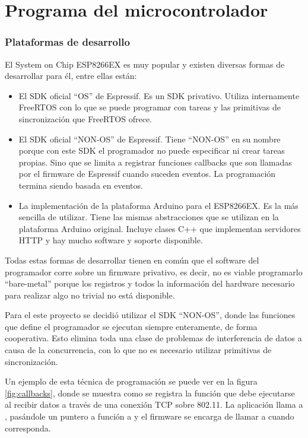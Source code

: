 \section{Programa del microcontrolador} \label{sec:sw-implementacion}

\subsubsection{Plataformas de desarrollo}\label{sec:sdk}
El System on Chip ESP8266EX es muy popular y existen diversas formas de desarrollar para él, entre ellas están:
\begin{itemize}
	\item El SDK oficial \enquote{OS} de Espressif. Es un SDK privativo. Utiliza internamente FreeRTOS con lo que se puede programar con tareas y las primitivas de sincronización que FreeRTOS ofrece.
	\item El SDK oficial \enquote{NON-OS} de Espressif. Tiene \enquote{NON-OS} en su nombre porque con este SDK el programador no puede especificar ni crear tareas propias. Sino que se limita a registrar funciones callbacks que son llamadas por el firmware de Espressif cuando suceden eventos. La programación termina siendo basada en eventos.
	\item La implementación de la plataforma Arduino para el ESP8266EX. Es la más sencilla de utilizar. Tiene las mismas abstracciones que se utilizan en la plataforma Arduino original. Incluye clases C++ que implementan servidores HTTP y hay mucho software y soporte disponible.
\end{itemize}

Todas estas formas de desarrollar tienen en común que el software del programador corre sobre un firmware privativo, es decir, no es viable programarlo \enquote{bare-metal} porque los registros y todos la información del hardware necesario para realizar algo no trivial no está disponible.

Para el este proyecto se decidió utilizar el SDK \enquote{NON-OS}, donde las funciones que define el programador se ejecutan siempre enteramente, de forma cooperativa. Esto elimina toda una clase de problemas de interferencia de datos a causa de la concurrencia, con lo que no es necesario utilizar primitivas de sincronización.

Un ejemplo de esta técnica de programación se puede ver en la figura \ref{fig:callbacks}, donde se muestra como se registra la función que debe ejecutarse al recibir datos a través de una conexión TCP sobre 802.11. La aplicación llama a , pasándole un puntero a función a  y el firmware se encarga de llamar a  cuando corresponda.

